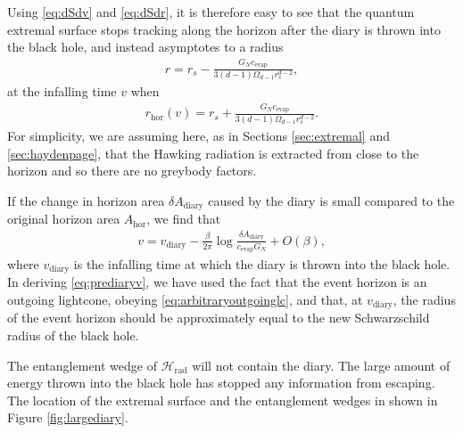 \documentclass[11pt,a4paper]{article}
\begin{document}
Using \eqref{eq:dSdv} and \eqref{eq:dSdr}, it is therefore easy to see that the quantum extremal surface stops tracking along the horizon after the diary is thrown into the black hole, and instead asymptotes to a radius
\begin{align} \label{eq:prediaryr}
r = r_s - \frac{G_N c_\text{evap}}{3 (d-1) \Omega_{d-1} r_s^{d-2}},
\end{align}
at the infalling time $v$ when
\begin{align}
r_\text{hor}(v) = r_s + \frac{G_N c_\text{evap}}{3 (d-1) \Omega_{d-1} r_s^{d-2}}.
\end{align}
For simplicity, we are assuming here, as in Sections \ref{sec:extremal} and \ref{sec:haydenpage}, that the Hawking radiation is extracted from close to the horizon and so there are no greybody factors. 

If the change in horizon area $\delta A_\text{diary}$ caused by the diary is small compared to the original horizon area $A_\text{hor}$, we find that
\begin{align} \label{eq:prediaryv}
v = v_\text{diary} - \frac{\beta}{2\pi} \log \frac{\delta A_\text{diary}}{c_\text{evap} G_N} + O(\beta),
\end{align}
where $v_\text{diary}$ is the infalling time at which the diary is thrown into the black hole. In deriving \eqref{eq:prediaryv}, we have used the fact that the event horizon is an outgoing lightcone, obeying \eqref{eq:arbitraryoutgoinglc}, and that, at $v_\text{diary}$, the radius of the event horizon should be approximately equal to the new Schwarzschild radius of the black hole.

The entanglement wedge of $\mathcal{H}_\text{rad}$ will not contain the diary. The large amount of energy thrown into the black hole has stopped any information from escaping. The location of the extremal surface and the entanglement wedges in shown in Figure \ref{fig:largediary}.
\end{document}
